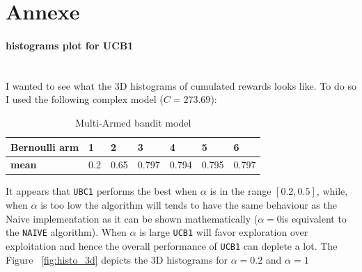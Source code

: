 \documentclass[11pt]{article}
\numberwithin{figure}{section} %
\begin{document}
\section{Annexe}
\paragraph{histograms plot for UCB1}\mbox{}\\
I wanted to see what the 3D histograms of cumulated rewards looks like. To do so I used the following complex model ($C = 273.69$):

\begin{table}[H]
\centering
\begin{tabular}{|l|l|l|l|l|l|l|}
\hline
\textbf{Bernoulli arm} & 1 & 2 & 3 & 4 & 5 & 6 \\ \hline
\textbf{mean} & 0.2 & 0.65 & 0.797 & 0.794 & 0.795 & 0.797 \\ \hline
\end{tabular}
\caption{Multi-Armed bandit model}
\label{table:mab_ber}
\end{table}

It appears that \texttt{UBC1} performs the best when $\alpha$ is in the range $[0.2, 0.5]$, while, when $\alpha$ is too low the algorithm will tends to have the same behaviour as the Naive implementation as it can be shown mathematically ($\alpha = 0$is equivalent to the \texttt{NAIVE} algorithm). When $\alpha$ is large \texttt{UCB1} will favor exploration over exploitation and hence the overall performance of \texttt{UCB1} can deplete a lot. The Figure ~\ref{fig:histo_3d} depicts the 3D histograms for $\alpha = 0.2$ and $\alpha = 1$
\end{document}

